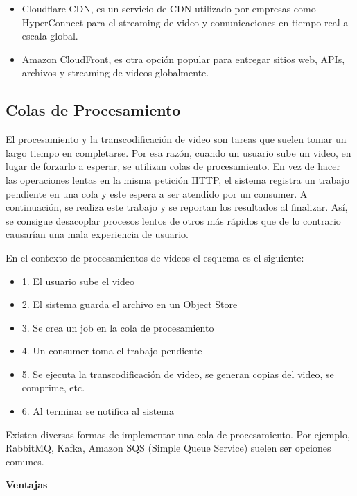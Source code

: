 \begin{itemize}
    \item Cloudflare CDN, es un servicio de CDN utilizado por empresas como HyperConnect para el streaming de video y comunicaciones en tiempo real a escala global.
    \item Amazon CloudFront, es otra opción popular para entregar sitios web, APIs, archivos y streaming de videos globalmente. 
\end{itemize}



\subsection{Colas de Procesamiento}

\label{cola}

El procesamiento y la transcodificación de video son tareas que suelen tomar un largo tiempo en completarse. Por esa razón, cuando un usuario sube un video, en lugar de forzarlo a esperar, se utilizan colas de procesamiento. En vez de hacer las operaciones lentas en la misma petición HTTP, el sistema registra un trabajo pendiente en una cola y este espera a ser atendido por un consumer. A continuación, se realiza este trabajo y se reportan los resultados al finalizar. Así, se consigue desacoplar procesos lentos de otros más rápidos que de lo contrario causarían una mala experiencia de usuario. 

En el contexto de procesamientos de videos el esquema es el siguiente:

\begin{itemize}
    \item 1. El usuario sube el video
    \item 2. El sistema guarda el archivo en un Object Store
    \item 3. Se crea un job en la cola de procesamiento
    \item 4. Un consumer toma el trabajo pendiente 
    \item 5. Se ejecuta la transcodificación de video, se generan copias del video, se comprime, etc.
    \item 6. Al terminar se notifica al sistema
\end{itemize}

Existen diversas formas de implementar una cola de procesamiento. Por ejemplo, RabbitMQ, Kafka, Amazon SQS (Simple Queue Service) suelen ser opciones comunes. 

\textbf{Ventajas}

